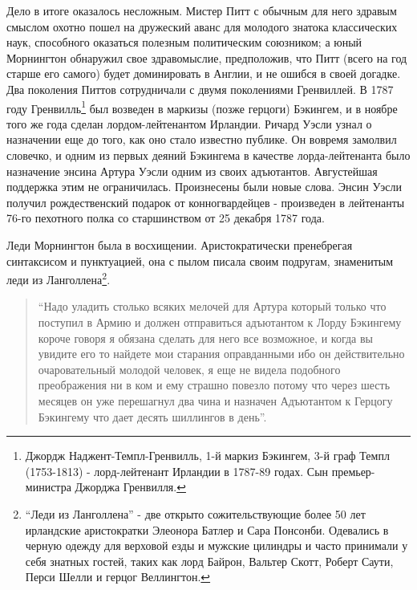 \documentclass[
  oneside,
  12pt,
  titlepage]{book}
\begin{document}
Дело в итоге оказалось несложным. Мистер Питт с обычным для него здравым смыслом охотно пошел на дружеский аванс для молодого знатока классических наук, способного оказаться полезным политическим союзником; а юный Морнингтон обнаружил свое здравомыслие, предположив, что Питт (всего на год старше его самого) будет доминировать в Англии, и не ошибся в своей догадке. Два поколения Питтов сотрудничали с двумя поколениями Гренвиллей. В 1787 году Гренвилль\footnote{Джордж Наджент-Темпл-Гренвилль, 1-й маркиз Бэкингем, 3-й граф Темпл (1753-1813) - лорд-лейтенант Ирландии в 1787-89 годах. Сын премьер-министра Джорджа Гренвилля.} был возведен в маркизы (позже герцоги) Бэкингем, и в ноябре того же года сделан лордом-лейтенантом Ирландии. Ричард Уэсли узнал о назначении еще до того, как оно стало известно публике. Он вовремя замолвил словечко, и одним из первых деяний Бэкингема в качестве лорда-лейтенанта было назначение энсина Артура Уэсли одним из своих адъютантов. Августейшая поддержка этим не ограничилась. Произнесены были новые слова. Энсин Уэсли получил рождественский подарок от конногвардейцев - произведен в лейтенанты 76-го пехотного полка со старшинством от 25 декабря 1787 года.

Леди Морнингтон была в восхищении. Аристократически пренебрегая синтаксисом и пунктуацией, она с пылом писала своим подругам, знаменитым леди из Ланголлена\footnote{``Леди из Ланголлена'' - две открыто сожительствующие более 50 лет ирландские аристократки Элеонора Батлер и Сара Понсонби. Одевались в черную одежду для верховой езды и мужские цилиндры и часто принимали у себя знатных гостей, таких как лорд Байрон, Вальтер Скотт, Роберт Саути, Перси Шелли и герцог Веллингтон.}.

\begin{quote}
``Надо уладить столько всяких мелочей для Артура который только что поступил в Армию и должен отправиться адъютантом к Лорду Бэкингему короче говоря я обязана сделать для него все возможное, и когда вы увидите его то найдете мои старания оправданными ибо он действительно очаровательный молодой человек, я еще не видела подобного преображения ни в ком и ему страшно повезло потому что через шесть месяцев он уже перешагнул два чина и назначен Адъютантом к Герцогу Бэкингему что дает десять шиллингов в день''.
\end{quote}
\end{document}
